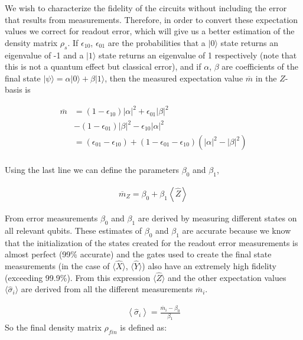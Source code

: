 We wish to characterize the fidelity of the circuits without including the error
that results from measurements. Therefore, in order to convert these expectation values we correct for
readout error, which will give us a better estimation of the density matrix
$\rho_s$. If $\epsilon_{10}$, $\epsilon_{01}$ are the probabilities that a
$|0\rangle$ state returns an eigenvalue of -1 and a
$|1\rangle$ state returns an eigenvalue of 1 respectively (note that this
is not a quantum effect but classical error), and if $\alpha$, $\beta$ are
coefficients of the final state
$|\psi\rangle=\alpha|0\rangle+\beta|1\rangle$,
then the measured expectation value $\overline{m}$ in the $Z$-basis is

\begin{align*}
  \overline{m} &=\left(1-\epsilon_{10}\right)\left|\alpha\right|^2+\epsilon_{01}\left|\beta\right|^2\\
&-\left(1-\epsilon_{01}\right)\left|\beta\right|^2
-\epsilon_{10}\left|\alpha\right|^2\\
&=\left(\epsilon_{01}-\epsilon_{10}\right)+\left(1-\epsilon_{01}-\epsilon_{10}\right)\left(\left|\alpha\right|^2-\left|\beta\right|^2\right)\\
\end{align*}

Using the last line we can define the parameters $\beta_0$ and $\beta_1$,

\begin{equation}
  \begin{split}
   \overline{m}_Z =\beta_0+\beta_1\left\langle \hat{Z}\right\rangle
\end{split}
\end{equation}

From error measurements $\beta_0$ and $\beta_1$ are derived by
measuring different states on all relevant qubits. These estimates of $\beta_0$
and $\beta_1$ are accurate because we know that the initialization of the states created for the readout error
measurements is almost perfect (99\% accurate) and the gates used to create the
final state measurements (in the case of $\langle \hat{X}\rangle$,
$\langle \hat{Y}\rangle$) also have an extremely high fidelity (exceeding
99.9\%)\cite{ibmq_burlington,ibmq_16_melbourne,ibmq_yorktown}. From this
expression $\langle \hat{Z}\rangle$ and the other expectation values
$\langle \hat{\sigma}_i\rangle$ are derived from all the different
measurements $\overline{m}_i$.

\begin{equation}
\begin{split} \left\langle
\hat{\sigma}_i\right\rangle=\frac{\overline{m}_i-\beta_0}{\beta_1}
\end{split}
\end{equation} So the final density matrix $\rho_{fin}$ is defined as:

